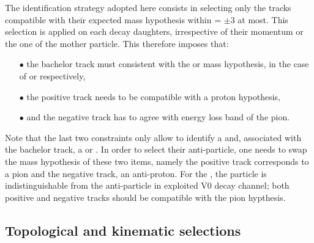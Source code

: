 The identification strategy adopted here consists in selecting only the tracks compatible with their expected mass hypothesis within \Nsigma = $\pm 3$ at most. This selection is applied on each decay daughters, irrespective of their momentum or the one of the mother particle. This therefore imposes that:
\begin{itemize}
\item[$\bullet$] the bachelor track must consistent with the \rmPiPM or \rmKPM mass hypothesis, in the case of \rmXiPM or \rmOmegaPM respectively,
\item[$\bullet$] the positive track needs to be compatible with a proton hypothesis,
\item[$\bullet$] and the negative track has to agree with energy loss band of the pion.
\end{itemize}
Note that the last two constraints only allow to identify a \rmLambda and, associated with the bachelor track, a \rmXiM or \rmOmegaM. In order to select their anti-particle, one needs to swap the mass hypothesis of these two items, namely the positive track corresponds to a pion and the negative track, an anti-proton. For the \rmKzeroS, the particle is indistinguishable from the anti-particle in exploited V0 decay channel; both positive and negative tracks should be compatible with the pion hypthesis.


\subsection{Topological and kinematic selections}

